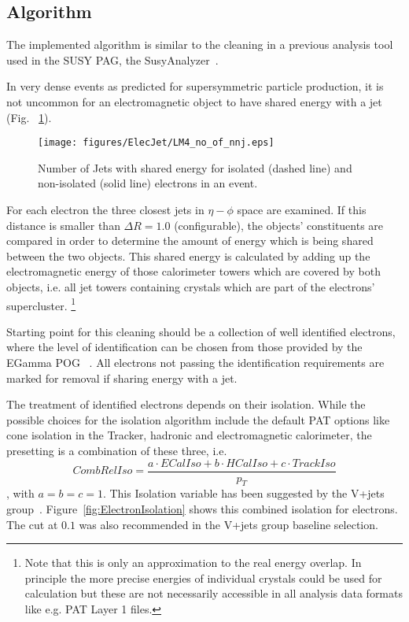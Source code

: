 \documentclass{cmspaper}
\begin{document}
\subsection{Algorithm}
The implemented algorithm is similar to the cleaning in a previous analysis
tool used in the SUSY PAG, the SusyAnalyzer~\cite{wikiSusyAnalyzer}.

In very dense events as predicted for supersymmetric particle production, it is
not uncommon for an electromagnetic object to have shared energy with a jet
(Fig. ~\ref{fig:NbJets}).

\begin{figure}[hbtp]
  \begin{center}
    \texttt{[image: figures/ElecJet/LM4\_no\_of\_nnj.eps]}
    \caption{Number of Jets with shared energy for isolated (dashed line) and
    non-isolated (solid line) electrons in an event.}
    \label{fig:NbJets}
  \end{center}
\end{figure}

For each electron the three closest jets in \( \eta-\phi\) space are
examined. If this distance is smaller than $\Delta R=1.0$ (configurable), the
objects' constituents are compared in order to determine the amount of energy
which is being shared between the two objects.
This shared energy is calculated by adding up the electromagnetic energy of
those calorimeter towers which are covered by both objects, i.e. all jet towers
containing crystals which are part of the electrons' supercluster.
\footnote{Note that this is only an approximation to the real energy overlap.
In principle the more precise energies of individual crystals could be used for
calculation but these are not necessarily accessible in all analysis data
formats like e.g. PAT Layer 1 files.}

Starting point for this cleaning should be a collection of well identified
electrons, where the level of identification can be chosen from those provided
by the EGamma POG ~\cite{elecID}. All electrons not passing the identification
requirements are marked for removal if sharing energy with a jet.

The treatment of identified electrons depends on their isolation. While the
possible choices for the isolation algorithm include the default PAT options
like cone isolation in the Tracker, hadronic and electromagnetic calorimeter,
the presetting is a combination of these three, i.e. 
\begin{equation}
    CombRelIso=\frac{a\cdot ECalIso+b\cdot HCalIso+c\cdot TrackIso}{p_T}
    \label{ElIsolation}
\end{equation}
, with \(a=b=c=1\). This Isolation variable has been suggested by the V+jets
group~\cite{vplusjets}. Figure~\ref{fig:ElectronIsolation} shows this combined
isolation for electrons. The cut at \(0.1\) was also recommended in the V+jets
group baseline selection.
\end{document}
